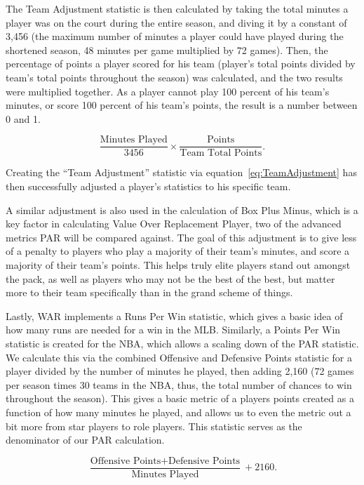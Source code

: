 \documentclass[12pt]{article}
\begin{document}
The Team Adjustment statistic 
is then calculated by taking the total minutes a player was on the court 
during the entire season, and diving 
it by a constant of 3,456 (the maximum number of minutes a player could 
have played during the shortened 
season, 48 minutes per game multiplied by 72 games). Then, the 
percentage of points a player scored for 
his team (player's total points divided by team's total points throughout the 
season) was calculated, and the 
two results were multiplied together. As a player cannot play 100 percent 
of his team's minutes, or score 
100 percent of his team's points, the result is a number between 0 and 1. 

\begin{equation}
\label{eq:TeamAdjustment}
  \frac{\text{Minutes Played}}{3456} \times
  \frac{\text{Points}}{\text{Team Total Points}}.
\end{equation}

Creating the ``Team Adjustment'' statistic via 
equation~\ref{eq:TeamAdjustment} has then successfully adjusted a 
player's statistics to his specific team.

A similar adjustment is also used 
in the calculation of Box Plus Minus, which is a key factor in calculating 
Value Over Replacement Player, 
two of the advanced metrics PAR will be compared against. The goal of 
this adjustment is to give less of a 
penalty to players who play a majority of their team's minutes, and score a 
majority of their team's points. 
This helps truly elite players stand out amongst the pack, as well as 
players who may not be the best of the 
best, but matter more to their team specifically than in the grand scheme 
of things.

Lastly, WAR implements a Runs Per Win statistic, which gives a basic 
idea of how many runs are needed 
for a win in the MLB. Similarly, a Points Per Win statistic is created for the 
NBA, which allows a scaling 
down of the PAR statistic. We calculate this via the combined Offensive 
and Defensive Points statistic for a 
player divided by the number of minutes he played, then adding 2,160 (72 
games per season times 30 
teams in the NBA, thus, the total number of chances to win throughout the 
season). This gives a basic 
metric of a players points created as a function of how many minutes he 
played, and allows us to even the 
metric out a bit more from star players to role players. This statistic serves 
as the denominator of our PAR 
calculation.

\begin{equation}
\label{eq:PointsPerWin}
 \frac{\text{Offensive Points} + \text{Defensive Points}} {\text{Minutes 
Played}} + 2160.
\end{equation}
\end{document}

